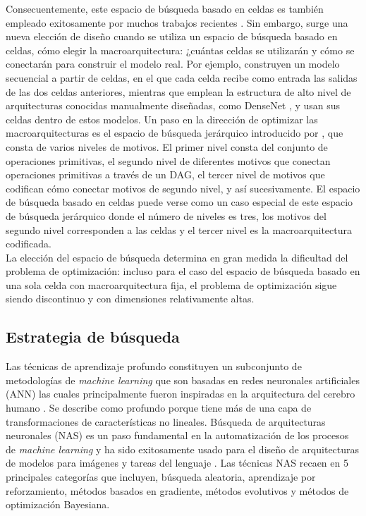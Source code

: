 Consecuentemente, este espacio de búsqueda basado en celdas es también empleado exitosamente por muchos trabajos recientes \parencite{68} \parencite{37} \parencite{62} \parencite{67} \parencite{69}. Sin embargo, surge una nueva elección de diseño cuando se utiliza un espacio de búsqueda basado en celdas, cómo elegir la macroarquitectura: ¿cuántas celdas se utilizarán y cómo se conectarán para construir el modelo real. Por ejemplo, \parencite{56} construyen un modelo secuencial a partir de celdas, en el que cada celda recibe como entrada las salidas de las dos celdas anteriores, mientras que \parencite{69} emplean la estructura de alto nivel de arquitecturas conocidas manualmente diseñadas, como DenseNet \parencite{70}, y usan sus celdas dentro de estos modelos. Un paso en la dirección de optimizar las macroarquitecturas es el espacio de búsqueda jerárquico introducido por \parencite{38}, que consta de varios niveles de motivos. El primer nivel consta del conjunto de operaciones primitivas, el segundo nivel de diferentes motivos que conectan operaciones primitivas a través de un DAG, el tercer nivel de motivos que codifican cómo conectar motivos de segundo nivel, y así sucesivamente. El espacio de búsqueda basado en celdas puede verse como un caso especial de este espacio de búsqueda jerárquico donde el número de niveles es tres, los motivos del segundo nivel corresponden a las celdas y el tercer nivel es la macroarquitectura codificada. \\
La elección del espacio de búsqueda determina en gran medida la dificultad del problema de optimización: incluso para el caso del espacio de búsqueda basado en una sola celda con macroarquitectura fija, el problema de optimización sigue siendo discontinuo y con dimensiones relativamente altas.


\subsection{Estrategia de búsqueda}

Las técnicas de aprendizaje profundo constituyen un subconjunto de metodologías de \textit{machine learning} que son basadas en redes neuronales artificiales (ANN) las cuales principalmente fueron inspiradas en la arquitectura del cerebro humano \parencite{34}. Se describe como profundo porque tiene más de una capa de transformaciones de características no lineales. Búsqueda de arquitecturas neuronales (NAS) es un paso fundamental en la automatización de los procesos de \textit{machine learning} y ha sido exitosamente usado para el diseño de arquitecturas de modelos para imágenes y tareas del lenguaje \parencite{35} \parencite{36} \parencite{37} \parencite{38} \parencite{39}. Las técnicas NAS recaen en 5 principales categorías que incluyen, búsqueda aleatoria, aprendizaje por reforzamiento, métodos basados en gradiente, métodos evolutivos y métodos de optimización Bayesiana.

